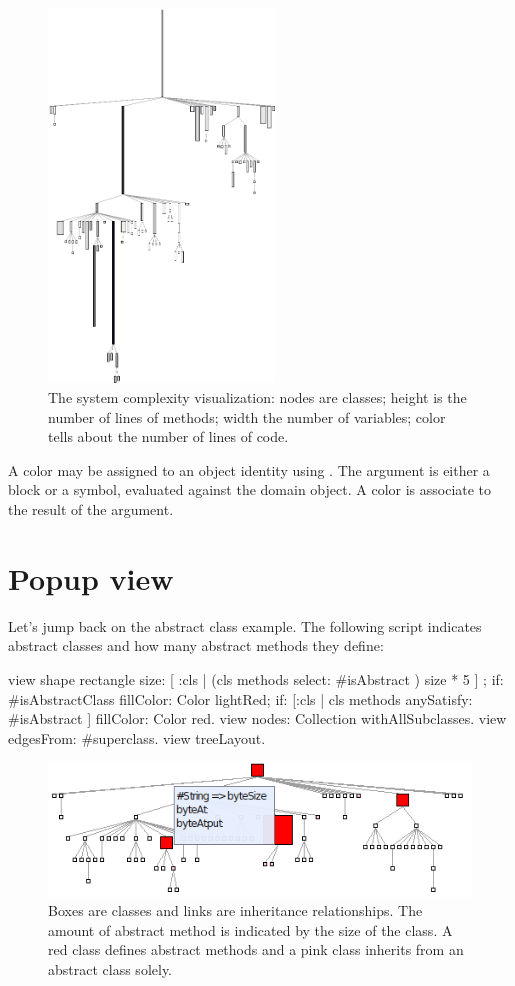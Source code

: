 \documentclass[a4paper,10pt,twoside]{book}
\begin{document}
\begin{figure}[htbp]
\centerline{\includegraphics[width=6cm]{systemComplexity}}
\caption{The system complexity visualization: nodes are classes; height is the number of lines of methods; width the number of variables; color tells about the number of lines of code.}
\label{fig:systemComplexity}
\end{figure}

A color may be assigned to an object identity using . The argument is either a block or a symbol, evaluated against the domain object. A color is associate to the result of the argument.


\section{Popup view}

Let's jump back on the abstract class example. The following script indicates abstract classes and how many abstract methods they define:

\begin{code}{}
view shape rectangle
	size: [ :cls | (cls methods select:  #isAbstract ) size * 5 ] ;
	if: #isAbstractClass fillColor: Color lightRed;
	if: [:cls | cls methods anySatisfy: #isAbstract ] fillColor: Color red.
view nodes: Collection withAllSubclasses.
view edgesFrom: #superclass.
view treeLayout.
\end{code}

\begin{figure}[htbp]
\centerline{\includegraphics[width=0.6\linewidth]{abstractClasses2.png}}
\caption{Boxes are classes and links are inheritance relationships. The amount of abstract method is indicated by the size of the class. A red class defines abstract methods and a pink class inherits from an abstract class solely.}
\label{fig:abstractClasses}
\end{figure}
\end{document}
